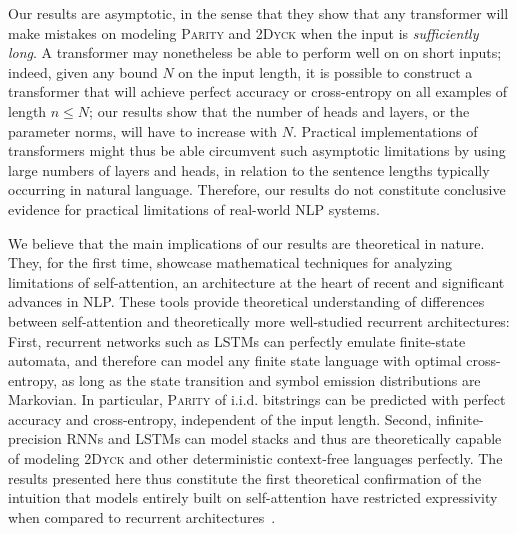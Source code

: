 \documentclass[11pt,a4paper]{article}
\begin{document}
Our results are asymptotic, in the sense that they show that any transformer will make mistakes on modeling \textsc{Parity} and \textsc{2Dyck} when the input is \emph{sufficiently long}.
A transformer may nonetheless be able to perform well on on short inputs; indeed, given any bound $N$ on the input length, it is possible to construct a transformer that will achieve perfect accuracy or cross-entropy on all examples of length $n \leq N$; our results show that the number of heads and layers, or the parameter norms, will have to increase with $N$.
Practical implementations of transformers might thus be able circumvent such asymptotic limitations by using large numbers of layers and heads, in relation to the sentence lengths typically occurring in natural language.
Therefore, our results do not constitute conclusive evidence for practical limitations of real-world NLP systems.


We believe that the main implications of our results are theoretical in nature.
They, for the first time, showcase mathematical techniques for analyzing limitations of self-attention, an architecture at the heart of recent and significant advances in NLP.
These tools provide theoretical understanding of differences between self-attention and theoretically more well-studied recurrent architectures:
First, recurrent networks such as LSTMs can perfectly emulate finite-state automata, and therefore can model any finite state language with optimal cross-entropy, as long as the state transition and symbol emission distributions are Markovian.
In particular, \textsc{Parity} of i.i.d. bitstrings can be predicted with perfect accuracy and cross-entropy, independent of the input length.
Second, infinite-precision RNNs and LSTMs can model stacks \cite{tabor2000fractal,gruning2006stack,kirov2012processing} and thus are theoretically capable of modeling \textsc{2Dyck} and other deterministic context-free languages perfectly.
The results presented here thus constitute the first theoretical confirmation of the intuition that models entirely built on self-attention have restricted expressivity when compared to recurrent architectures~\cite{tran2018importance,dehghani2018universal,shen2018disan,chen2018best,hao2019modeling}.
\end{document}
